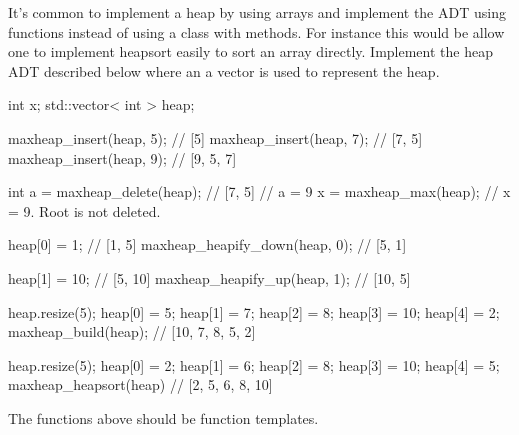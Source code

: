   It's common to implement a heap by using arrays and implement the
  ADT using functions instead of using a class with methods.
  For instance this would be allow one to implement heapsort easily
  to sort an array directly.
  Implement the heap ADT described below where an a vector is used
  to represent the heap.
\begin{console}
int x;
std::vector< int > heap;

maxheap_insert(heap, 5);   // [5]
maxheap_insert(heap, 7);   // [7, 5]
maxheap_insert(heap, 9);   // [9, 5, 7]

int a = maxheap_delete(heap); // [7, 5]
                           // a = 9
x = maxheap_max(heap);     // x = 9. Root is not deleted.

heap[0] = 1;               // [1, 5]
maxheap_heapify_down(heap, 0); // [5, 1]

heap[1] = 10;              // [5, 10]
maxheap_heapify_up(heap, 1); // [10, 5]

heap.resize(5);
heap[0] = 5;
heap[1] = 7;
heap[2] = 8;
heap[3] = 10;
heap[4] = 2;
maxheap_build(heap);       // [10, 7, 8, 5, 2]

heap.resize(5);
heap[0] = 2;
heap[1] = 6;
heap[2] = 8;
heap[3] = 10;
heap[4] = 5;
maxheap_heapsort(heap)     // [2, 5, 6, 8, 10]
\end{console}
The functions above should be function templates.
